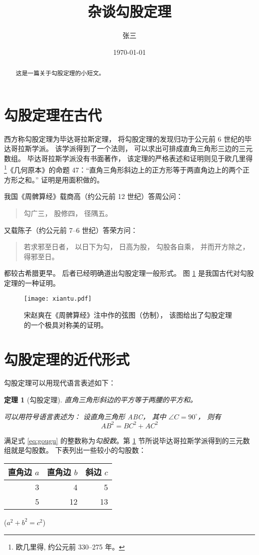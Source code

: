 \documentclass[UTF8]{ctexart}
\title{\heiti 杂谈勾股定理}
\author{\kaishu 张三}
\date{\today}
\newtheorem{thm}{定理}
\newcommand\degree{^\circ}
\newenvironment{myquote}
  {\begin{quote}\kaishu\zihao{-5}}
  {\end{quote}}
\begin{document}
\maketitle
\begin{abstract}
  这是一篇关于勾股定理的小短文。
\end{abstract}
\tableofcontents
\section{勾股定理在古代}\label{sec:ancient}
西方称勾股定理为毕达哥拉斯定理， 将勾股定理的发现归功于公元前 6 世纪的毕达哥拉斯学派\cite{Kline}。 该学派得到了一个法则， 可以求出可排成直角三角形三边的三元数组。 毕达哥拉斯学派没有书面著作， 该定理的严格表述和证明则见于欧几里得\footnote{欧几里得, 约公元前 330--275 年。}《几何原本》的命题 47：“直角三角形斜边上的正方形等于两直角边上的两个正方形之和。” 证明是用面积做的。

我国《周髀算经》载商高（约公元前 12 世纪）答周公问：
\begin{myquote}
勾广三， 股修四， 径隅五。
\end{myquote}
又载陈子（约公元前 7--6 世纪）答荣方问：
\begin{myquote}
若求邪至日者， 以日下为勾， 日高为股， 勾股各自乘， 并而开方除之， 得邪至日。
\end{myquote}
都较古希腊更早。 后者已经明确道出勾股定理一般形式。 图 \ref{fig:xiantu} 是我国古代对勾股定理的一种证明\cite{quanjing}。

\begin{figure}[ht]
  \centering
  \texttt{[image: xiantu.pdf]}
  \caption{宋赵爽在《周髀算经》注中作的弦图（仿制）， 该图给出了勾股定理的一个极具对称美的证明。}\label{fig:xiantu}
\end{figure}

\section{勾股定理的近代形式}
勾股定理可以用现代语言表述如下：
\begin{thm}[勾股定理]
直角三角形斜边的平方等于两腰的平方和。

可以用符号语言表述为： 设直角三角形 ABC， 其中 $\angle C = 90\degree$， 则有
\begin{equation}\label{eq:gougu}
AB^2 = BC^2 + AC^2
\end{equation}
\end{thm}

满足式 \eqref{eq:gougu} 的整数称为\emph{勾股数}。第 \ref{sec:ancient} 节所说毕达哥拉斯学派得到的三元数组就是勾股数。 下表列出一些较小的勾股数：
\begin{table}[H]
\begin{tabular}{|rrr|}
  \hline
直角边 $a$ & 直角边 $b$ & 斜边 $c$\\
\hline
  3 & 4 & 5 \\
  5 & 12 & 13 \\
\hline
\end{tabular}%
\qquad
($a^2 + b^2 = c^2$)
\end{table}
\nocite{Shiye}

\end{document}
